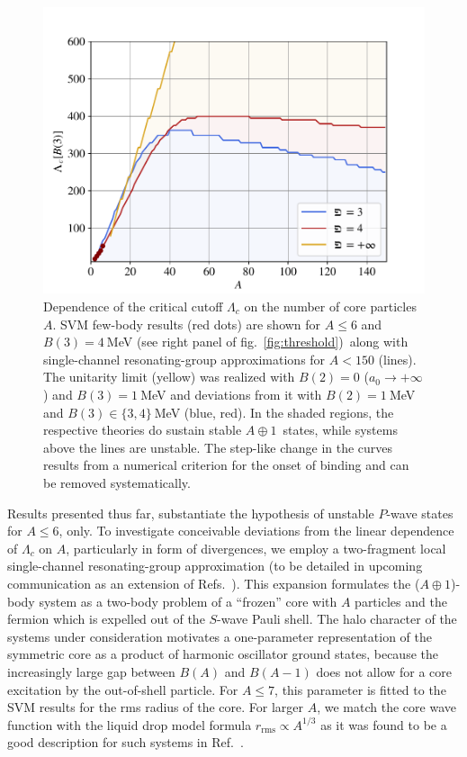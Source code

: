 \documentclass[onecolumn,preprint,superscriptaddress,nofootinbib]{revtex4-1}
\newcommand{\lc}{\ensuremath{\Lambda_c}}
\newcommand{\abb}{\mbox{\ensuremath{A\oplus 1}}}
\newcommand{\figref}[1]{fig.~\ref{#1}}
\begin{document}
\begin{figure}
\centering
\includegraphics[width=\linewidth]{./RGM-pe-v1.pdf} 
\caption{Dependence of the critical cutoff $\lc$ on the number of core particles
$A$. SVM few-body results (red dots) are shown for $A\leq6$ and $B(3)=4~$MeV (see right panel of \figref{fig:threshold})~along with single-channel resonating-group approximations for $A<150$ (lines). The unitarity limit
(yellow) was realized with $B(2)=0$ ($a_0\rightarrow+\infty$) and $B(3)=1~$MeV and deviations from it
with $B(2)=1~$MeV and $B(3)\in\lbrace3,4\rbrace~$MeV (blue, red). 
In the shaded regions, the respective theories do sustain stable \abb~states,
while systems above the lines are unstable.
The step-like change in the curves results from a numerical criterion for the onset of binding and
can be removed systematically. }
\label{fig:RGM}
\end{figure}

Results presented thus far, substantiate the hypothesis of unstable $P$-wave states for $A\leq 6$, only. 
To investigate conceivable deviations from
the linear dependence of $\lc$ on $A$, particularly in form of divergences, we employ a two-fragment
local single-channel resonating-group approximation
(to be detailed in upcoming communication as an extension of Refs.~\cite{PhysRev.52.1083,Naidon_2016}). 
This expansion formulates the (\abb)-body system as a two-body problem of a ``frozen'' core with $A$ particles and the
fermion which is expelled out of the $S$-wave Pauli shell.
The halo character of the systems under consideration motivates a one-parameter representation of the symmetric core as a product of harmonic oscillator ground states, because the increasingly large gap between $B(A)$ and $B(A-1)$ does not allow for a core excitation
by the out-of-shell particle.
For $A \leq 7$, this parameter is fitted to the SVM results for the rms radius of the core.
For larger $A$, we match the core wave function with the liquid drop model formula $r_\text{rms}\propto A^{1/3}$ as 
it was found to be a good description for such systems in Ref.~\cite{manybosons}.
\end{document}
